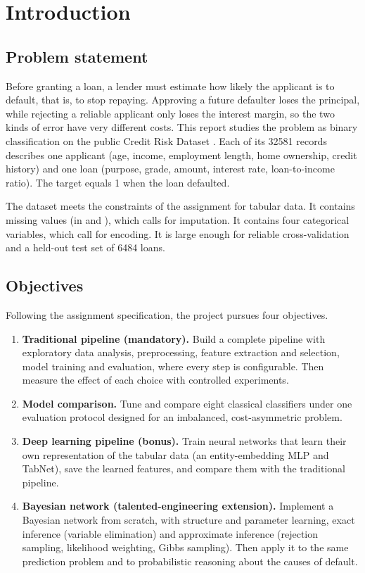 \section{Introduction}
\label{sec:intro}

\subsection{Problem statement}
Before granting a loan, a lender must estimate how likely the applicant is to default, that is, to stop repaying.
Approving a future defaulter loses the principal, while rejecting a reliable applicant only loses the interest margin, so the two kinds of error have very different costs.
This report studies the problem as binary classification on the public Credit Risk Dataset \cite{kaggle_credit}.
Each of its \num{32581} records describes one applicant (age, income, employment length, home ownership, credit history) and one loan (purpose, grade, amount, interest rate, loan-to-income ratio).
The target  equals 1 when the loan defaulted.

The dataset meets the constraints of the assignment for tabular data.
It contains missing values (in  and ), which calls for imputation.
It contains four categorical variables, which call for encoding.
It is large enough for reliable cross-validation and a held-out test set of \num{6484} loans.

\subsection{Objectives}
Following the assignment specification, the project pursues four objectives.
\begin{enumerate}
  \item \textbf{Traditional pipeline (mandatory).} Build a complete pipeline with exploratory data analysis, preprocessing, feature extraction and selection, model training and evaluation, where every step is configurable. Then measure the effect of each choice with controlled experiments.
  \item \textbf{Model comparison.} Tune and compare eight classical classifiers under one evaluation protocol designed for an imbalanced, cost-asymmetric problem.
  \item \textbf{Deep learning pipeline (bonus).} Train neural networks that learn their own representation of the tabular data (an entity-embedding MLP and TabNet), save the learned features, and compare them with the traditional pipeline.
  \item \textbf{Bayesian network (talented-engineering extension).} Implement a Bayesian network from scratch, with structure and parameter learning, exact inference (variable elimination) and approximate inference (rejection sampling, likelihood weighting, Gibbs sampling). Then apply it to the same prediction problem and to probabilistic reasoning about the causes of default.
\end{enumerate}

